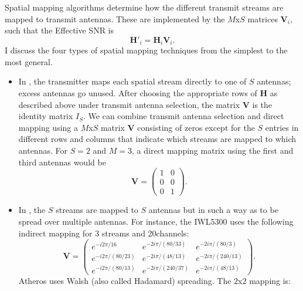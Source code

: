  Spatial mapping algorithms determine how the different transmit streams are mapped to transmit antennas. These are implemented by the $M$x$S$ matrices $\mathbf{V}_i$, such that the Effective SNR is
\begin{equation}
	\mathbf{H}'_i = \mathbf{H}_i\mathbf{V}_i.
\end{equation}
I discuss the four types of spatial mapping techniques from the simplest to the most general.

\begin{itemize}[leftmargin=0.5cm,parsep=1ex,itemsep=1ex,topsep=1ex]
	\item In , the transmitter maps each spatial stream directly to one of $S$ antennas; excess antennas go unused. After choosing the appropriate rows of $\mathbf{H}$ as described above under transmit antenna selection, the matrix $\mathbf{V}$ is the identity matrix $I_S$. We can combine transmit antenna selection and direct mapping using a $M$x$S$ matrix $\mathbf{V}$ consisting of zeros except for the $S$ entries in different rows and columns that indicate which streams are mapped to which antennas. For $S=2$ and $M=3$, a direct mapping matrix using the first and third antennas would be
	\begin{equation*}
		\tag{Combined $3$x$2$ TX Antenna Selection and Direct Mapping}
		\mathbf{V} = \begin{pmatrix}
		1 & 0\\
		0 & 0\\
		0 & 1
		\end{pmatrix}.
	\end{equation*}
%
	\item In , the $S$ streams are mapped to $S$ antennas but in such a way as to be spread over multiple antennas. For instance, the IWL5300 uses the following indirect mapping for 3 streams and 20\MHz channels:
	\begin{equation*}
		\tag{IWL5300 $3$x$3$}
		\mathbf{V} = \begin{pmatrix}
		e^{-i2\pi/16} & e^{-2i\pi/(80/33)} & e^{-2i\pi/(80/3)} \\
		e^{-i2\pi/(80/23)} & e^{-2i\pi/(48/13)} & e^{-2i\pi/(240/13)} \\
		e^{-i2\pi/(80/13)} & e^{-2i\pi/(240/37)} & e^{-2i\pi/(48/13)}
		\end{pmatrix}.
	\end{equation*}
	Atheros uses Walsh (also called Hadamard) spreading. The $2$x$2$ mapping is:
	\begin{equation*}

\end{equation*}
\end{itemize}
